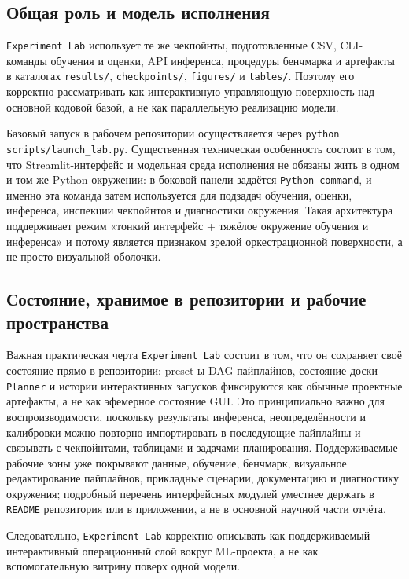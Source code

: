 \documentclass[11pt]{article}
\begin{document}
\subsection{Общая роль и модель исполнения}

\texttt{Experiment Lab} использует те же чекпойнты, подготовленные CSV, CLI-команды обучения и оценки, API инференса, процедуры бенчмарка и артефакты в каталогах \texttt{results/}, \texttt{checkpoints/}, \texttt{figures/} и \texttt{tables/}. Поэтому его корректно рассматривать как интерактивную управляющую поверхность над основной кодовой базой, а не как параллельную реализацию модели.

Базовый запуск в рабочем репозитории осуществляется через \texttt{python scripts/launch\_lab.py}. Существенная техническая особенность состоит в том, что Streamlit-интерфейс и модельная среда исполнения не обязаны жить в одном и том же Python-окружении: в боковой панели задаётся \texttt{Python command}, и именно эта команда затем используется для подзадач обучения, оценки, инференса, инспекции чекпойнтов и диагностики окружения. Такая архитектура поддерживает режим «тонкий интерфейс + тяжёлое окружение обучения и инференса» и потому является признаком зрелой оркестрационной поверхности, а не просто визуальной оболочки.

\subsection{Состояние, хранимое в репозитории и рабочие пространства}

Важная практическая черта \texttt{Experiment Lab} состоит в том, что он сохраняет своё состояние прямо в репозитории: preset-ы DAG-пайплайнов, состояние доски \texttt{Planner} и истории интерактивных запусков фиксируются как обычные проектные артефакты, а не как эфемерное состояние GUI. Это принципиально важно для воспроизводимости, поскольку результаты инференса, неопределённости и калибровки можно повторно импортировать в последующие пайплайны и связывать с чекпойнтами, таблицами и задачами планирования. Поддерживаемые рабочие зоны уже покрывают данные, обучение, бенчмарк, визуальное редактирование пайплайнов, прикладные сценарии, документацию и диагностику окружения; подробный перечень интерфейсных модулей уместнее держать в \texttt{README} репозитория или в приложении, а не в основной научной части отчёта.

Следовательно, \texttt{Experiment Lab} корректно описывать как поддерживаемый интерактивный операционный слой вокруг ML-проекта, а не как вспомогательную витрину поверх одной модели.
\end{document}
